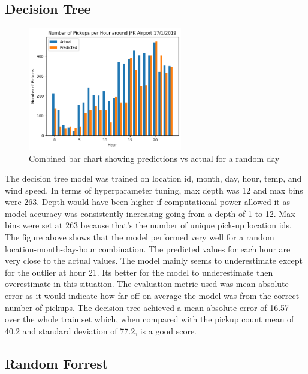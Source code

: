 \documentclass[11pt]{article}
\begin{document}
\subsection{Decision Tree}

\begin{figure}[h]
    \includegraphics[width=0.6\textwidth]{plots/tree.png}
    \centering
    \caption{Combined bar chart showing predictions vs actual for a random day} %
\end{figure}

The decision tree model was trained on location id, month, day, hour, temp, and wind speed. In terms of hyperparameter tuning, max depth was 12 and max bins were 263. Depth would have been higher if computational power allowed it as model accuracy was consistently increasing going from a depth of 1 to 12. Max bins were set at 263 because that’s the number of unique pick-up location ids. The figure above shows that the model performed very well for a random location-month-day-hour combination. The predicted values for each hour are very close to the actual values. The model mainly seems to underestimate except for the outlier at hour 21. Its better for the model to underestimate then overestimate in this situation. The evaluation metric used was mean absolute error as it would indicate how far off on average the model was from the correct number of pickups. The decision tree achieved a mean absolute error of 16.57 over the whole train set which, when compared with the pickup count mean of 40.2 and standard deviation of 77.2, is a good score.

\subsection{Random Forrest}
\end{document}
